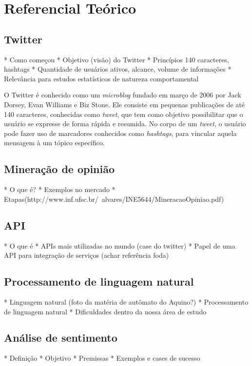 \chapter{Referencial Teórico}\label{cap:referencial_teorico}

\section{Twitter}\label{sec:twitter}

* Como começou
* Objetivo (visão) do Twitter
* Princípios 140 caracteres, hashtags
* Quantidade de usuários ativos, alcance, volume de informações
* Relevância para estudos estatísticos de natureza comportamental

O Twitter é conhecido como um \textit{microblog} fundado em março de 2006 por Jack Dorsey, Evan Williams e Biz Stone. Ele consiste em pequenas publicações de até 140 caracteres, conhecidas como \textit{tweet}, que tem como objetivo possibilitar que o usuário se expresse de forma rápida e resumida. No corpo de um \textit{tweet}, o usuário pode fazer uso de marcadores conhecidos como \textit{hashtags}\cite{waite2012paperback}, para vincular aquela mensagem à um tópico específico.


\section{Mineração de opinião}\label{sec:mineracao_dados}

* O que é?
* Exemplos no mercado
* Etapas(http://www.inf.ufsc.br/~alvares/INE5644/MineracaoOpiniao.pdf)

\section{API}\label{sec:api}
* O que é
* APIs mais utilizadas no mundo (case do twitter)
* Papel de uma API para integração de serviços (achar referência foda)

\section{Processamento de linguagem natural}\label{sec:nlp}
* Linguagem natural (foto da matéria de autômato do Aquino?)
* Processamento de linguagem natural
* Dificuldades dentro da nossa área de estudo

\section{Análise de sentimento}\label{sec:analise_sentimento}
* Definição
* Objetivo
* Premissas
* Exemplos e cases de sucesso



